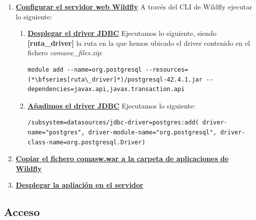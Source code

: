 \begin{enumerate}
\begin{enumerate}
	\item \underline{\textbf{Importar la base de datos \emph{\textbf{db\_comasw}}}}.\\
Desde el terminal nos colocamos en la ruta en la que hemos descomprimido el fichero y ejecutamos lo siguiente:
\begin{lstlisting}[style=comando]
  $ psql -U postgres db_comasw < db_comasw.sql
\end{lstlisting}

	\end{enumerate}
\item \underline{\textbf{Configurar el servidor web Wildfly}}\newline
A través del CLI de Wildfly ejecutar lo siguiente:

	\begin{enumerate}
	\item  \underline{\textbf{Desplegar el driver JDBC}}\newline
Ejecutamos lo siguiente, siendo \textbf{[ruta\_driver]} la ruta en la que hemos ubicado el driver contenido en el fichero \emph{comasw\_files.zip}:
\begin{lstlisting}[style=comando]
  module add --name=org.postgresql --resources=(*\bfseries[ruta\_driver]*)/postgresql-42.4.1.jar --dependencies=javax.api,javax.transaction.api
\end{lstlisting}

	\item \underline{\textbf{Añadimos el driver JDBC}}\newline
Ejecutamos lo siguiente:
\begin{lstlisting}[style=comando]
/subsystem=datasources/jdbc-driver=postgres:add( driver-name="postgres", driver-module-name="org.postgresql", driver-class-name=org.postgresql.Driver)
\end{lstlisting}
	\end{enumerate}

\item \underline{\textbf{Copiar el fichero comasw.war a la carpeta de aplicaciones de Wildfly}}
\item \underline{\textbf{Desplegar la apliación en el servidor}}
\end{enumerate}


 
\subsection{Acceso}
\label{sub:acceso-administrador}
 
